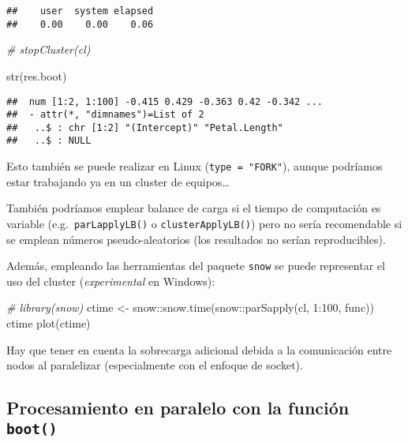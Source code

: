 \documentclass[
]{book}
\newenvironment{Shaded}{\begin{snugshade}}{\end{snugshade}}
\newcommand{\CommentTok}[1]{\textcolor[rgb]{0.56,0.35,0.01}{\textit{#1}}}
\newcommand{\DecValTok}[1]{\textcolor[rgb]{0.00,0.00,0.81}{#1}}
\newcommand{\FunctionTok}[1]{\textcolor[rgb]{0.00,0.00,0.00}{#1}}
\newcommand{\NormalTok}[1]{#1}
\newcommand{\OtherTok}[1]{\textcolor[rgb]{0.56,0.35,0.01}{#1}}
\newcommand{\SpecialCharTok}[1]{\textcolor[rgb]{0.00,0.00,0.00}{#1}}
\theoremstyle{break}
\theoremstyle{definition}
\theoremstyle{definition}
\theoremstyle{definition}
\theoremstyle{definition}
\theoremstyle{remark}
\begin{document}
\begin{verbatim}
##    user  system elapsed 
##    0.00    0.00    0.06
\end{verbatim}

\begin{Shaded}
\begin{Highlighting}[]
\CommentTok{\# stopCluster(cl)}

\FunctionTok{str}\NormalTok{(res.boot)}
\end{Highlighting}
\end{Shaded}

\begin{verbatim}
##  num [1:2, 1:100] -0.415 0.429 -0.363 0.42 -0.342 ...
##  - attr(*, "dimnames")=List of 2
##   ..$ : chr [1:2] "(Intercept)" "Petal.Length"
##   ..$ : NULL
\end{verbatim}

Esto también se puede realizar en Linux (\texttt{type\ =\ "FORK"}),
aunque podríamos estar trabajando ya en un cluster de equipos\ldots{}

También podríamos emplear balance de carga si el tiempo de computación es variable
(e.g.~\texttt{parLapplyLB()} o \texttt{clusterApplyLB()}) pero no sería recomendable si se emplean
números pseudo-aleatorios (los resultados no serían reproducibles).

Además, empleando las herramientas del paquete \texttt{snow} se puede representar el uso
del cluster (\emph{experimental} en Windows):

\begin{Shaded}
\begin{Highlighting}[]
\CommentTok{\# library(snow)}
\NormalTok{ctime }\OtherTok{\textless{}{-}}\NormalTok{ snow}\SpecialCharTok{::}\FunctionTok{snow.time}\NormalTok{(snow}\SpecialCharTok{::}\FunctionTok{parSapply}\NormalTok{(cl, }\DecValTok{1}\SpecialCharTok{:}\DecValTok{100}\NormalTok{, func))}
\NormalTok{ctime}
\FunctionTok{plot}\NormalTok{(ctime)}
\end{Highlighting}
\end{Shaded}

Hay que tener en cuenta la sobrecarga adicional debida a la comunicación entre nodos
al paralelizar (especialmente con el enfoque de socket).

\hypertarget{procesamiento-en-paralelo-con-la-funciuxf3n-boot}{%
\subsection{\texorpdfstring{Procesamiento en paralelo con la función \texttt{boot()}}{Procesamiento en paralelo con la función boot()}}\label{procesamiento-en-paralelo-con-la-funciuxf3n-boot}}
\end{document}
